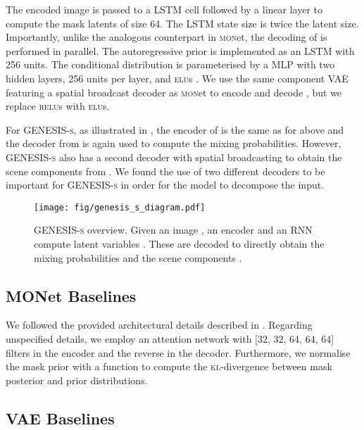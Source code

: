 \documentclass{article}
\begin{document}
The encoded image is passed to a \gls{LSTM} cell \citep{hochreiter1997long} followed by a linear layer to compute the mask latents  of size 64.
The \gls{LSTM} state size is twice the latent size.
Importantly, unlike the analogous counterpart in \textsc{mon}et, the decoding of  is performed in parallel.
The autoregressive prior  is implemented as an \gls{LSTM} with 256 units.
The conditional distribution  is parameterised by a \gls{MLP} with two hidden layers, 256 units per layer, and \textsc{elu}s \citep{clevert2015fast}.
We use the same component \gls{VAE} featuring a spatial broadcast decoder as \textsc{mon}et to encode and decode , but we replace \textsc{relu}s \citep{glorot2011deep} with \textsc{elu}s.

For \gls{GENESIS}\textsc{-s}, as illustrated in , the encoder of  is the same as for  above and the decoder from \citet{berg2018sylvester} is again used to compute the mixing probabilities.
However, \gls{GENESIS}\textsc{-s} also has a second decoder with spatial broadcasting to obtain the scene components  from .
We found the use of two different decoders to be important for \gls{GENESIS}\textsc{-s} in order for the model to decompose the input.

\begin{figure}[h]
    \centering
    \texttt{[image: fig/genesis\_s\_diagram.pdf]}
    \caption{\gls{GENESIS}-\textsc{s} overview. Given an image , an encoder and an \gls{RNN} compute latent variables . These are decoded to directly obtain the mixing probabilities  and the scene components .}
    \label{fig:arch_s}
\end{figure}


\subsection{MONet Baselines}
\label{app:monet_baseline}

We followed the provided architectural details described in \citet{burgess2019monet}.
Regarding unspecified details, we employ an attention network with [32, 32, 64, 64, 64] filters in the encoder and the reverse in the decoder.
Furthermore, we normalise the mask prior with a  function to compute the \textsc{kl}-divergence between mask posterior and prior distributions.


\subsection{VAE Baselines}
\label{app:vae_baseline}
\end{document}
